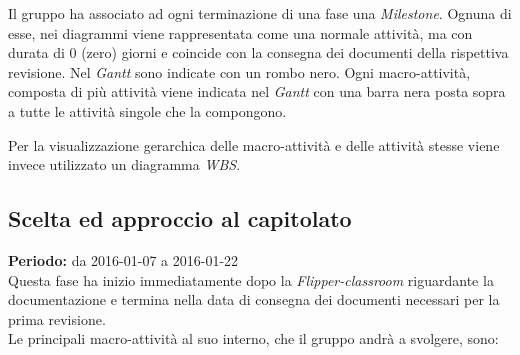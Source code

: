 \documentclass[a4paper]{article}
\begin{document}
		Il gruppo ha associato ad ogni terminazione di una fase una \emph{Milestone}. Ognuna di esse, nei diagrammi viene rappresentata 
		come una normale attività, ma con durata di 0 (zero) giorni e coincide con la consegna dei documenti della rispettiva revisione.
		Nel \emph{Gantt} sono indicate con un rombo nero.
		Ogni macro-attività, composta di più attività viene indicata nel \emph{Gantt} con una barra nera posta sopra a tutte le attività 
		singole che la compongono.
		
		Per la visualizzazione gerarchica delle macro-attività e delle attività stesse viene invece utilizzato un diagramma \emph{WBS}.
		
		\subsection{Scelta ed approccio al capitolato}
			\textbf{Periodo:} da 2016-01-07 a 2016-01-22 \\
			Questa fase ha inizio immediatamente dopo la \emph{Flipper-classroom} riguardante la documentazione e termina nella data
			di consegna dei documenti necessari per la prima revisione. \\ 
			Le principali macro-attività al suo interno, che il gruppo andrà a svolgere, sono:
\end{document}
